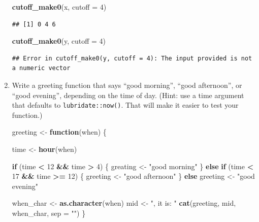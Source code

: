 \documentclass[]{book}
\newenvironment{Shaded}{\begin{snugshade}}{\end{snugshade}}
\newcommand{\ControlFlowTok}[1]{\textcolor[rgb]{0.13,0.29,0.53}{\textbf{#1}}}
\newcommand{\DataTypeTok}[1]{\textcolor[rgb]{0.13,0.29,0.53}{#1}}
\newcommand{\DecValTok}[1]{\textcolor[rgb]{0.00,0.00,0.81}{#1}}
\newcommand{\KeywordTok}[1]{\textcolor[rgb]{0.13,0.29,0.53}{\textbf{#1}}}
\newcommand{\NormalTok}[1]{#1}
\newcommand{\OperatorTok}[1]{\textcolor[rgb]{0.81,0.36,0.00}{\textbf{#1}}}
\newcommand{\StringTok}[1]{\textcolor[rgb]{0.31,0.60,0.02}{#1}}
\theoremstyle{definition}
\theoremstyle{definition}
\theoremstyle{definition}
\theoremstyle{remark}
\begin{document}
\begin{enumerate}
\begin{Shaded}
\begin{Highlighting}[]
\KeywordTok{cutoff_make0}\NormalTok{(x, }\DataTypeTok{cutoff =} \DecValTok{4}\NormalTok{)}
\end{Highlighting}
\end{Shaded}

\begin{verbatim}
## [1] 0 4 6
\end{verbatim}

\begin{Shaded}
\begin{Highlighting}[]
\KeywordTok{cutoff_make0}\NormalTok{(y, }\DataTypeTok{cutoff =} \DecValTok{4}\NormalTok{)}
\end{Highlighting}
\end{Shaded}

\begin{verbatim}
## Error in cutoff_make0(y, cutoff = 4): The input provided is not a numeric vector
\end{verbatim}
\item
  Write a greeting function that says ``good morning'', ``good
  afternoon'', or ``good evening'', depending on the time of day. (Hint:
  use a time argument that defaults to \texttt{lubridate::now()}. That
  will make it easier to test your function.)

\begin{Shaded}
\begin{Highlighting}[]
\NormalTok{greeting <-}\StringTok{ }\ControlFlowTok{function}\NormalTok{(when) \{}

\NormalTok{  time <-}\StringTok{ }\KeywordTok{hour}\NormalTok{(when)}

  \ControlFlowTok{if}\NormalTok{ (time }\OperatorTok{<}\StringTok{ }\DecValTok{12} \OperatorTok{&&}\StringTok{ }\NormalTok{time }\OperatorTok{>}\StringTok{ }\DecValTok{4}\NormalTok{) \{}
\NormalTok{    greating <-}\StringTok{ "good morning"}
\NormalTok{  \} }\ControlFlowTok{else} \ControlFlowTok{if}\NormalTok{ (time }\OperatorTok{<}\StringTok{ }\DecValTok{17} \OperatorTok{&&}\StringTok{ }\NormalTok{time }\OperatorTok{>=}\StringTok{ }\DecValTok{12}\NormalTok{) \{}
\NormalTok{    greeting <-}\StringTok{ "good afternoon"}
\NormalTok{  \} }\ControlFlowTok{else}\NormalTok{ greeting <-}\StringTok{ "good evening"}

\NormalTok{  when_char <-}\StringTok{ }\KeywordTok{as.character}\NormalTok{(when)}
\NormalTok{  mid <-}\StringTok{ ", it is: "}
  \KeywordTok{cat}\NormalTok{(greeting, mid, when_char, }\DataTypeTok{sep =} \StringTok{""}\NormalTok{)}
\NormalTok{\}}


\end{Highlighting}
\end{Shaded}
\end{enumerate}
\end{document}
